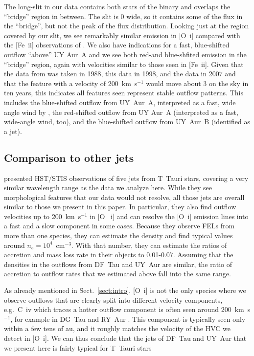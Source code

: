 \documentclass[twocolumn,trackchanges]{aastex63}
\begin{document}
The long-slit in our data contains both stars of the binary and overlaps the ``bridge'' region in between. The slit is 0 wide, so it contains some of the flux in the ``bridge'', but not the peak of the flux distribution. Looking just at the region covered by our slit, we see remarkably similar emission in [O~{\sc i}] compared with the [Fe~{\sc ii}] observations of \citet{2014ApJ...786...63P}. We also have indications for a fast, blue-shifted outflow ``above'' UY Aur~A and we see both red-and blue-shfited emission in the ``bridge'' region, again with velocities similar to those seen in [Fe~{\sc ii}]. Given that the data from \citet{1997A&AS..126..437H} was taken in 1988, this data in 1998, and the \citet{2014ApJ...786...63P} data in 2007 and that the feature with a velocity of 200~km~s$^{-1}$ would move about 3\arcsec{} on the sky in ten years, this indicates all features seen represent stable outflow patterns. This includes the blue-shifted outflow from UY~Aur~A, interpreted as a fast, wide angle wind by \citet{2014ApJ...786...63P}, the red-shifted outflow from UY Aur~A (interpreted as a fast, wide-angle wind, too), and the blue-shifted outflow from UY~Aur~B (identified as a jet).

\subsection{Comparison to other jets}
\citet{2008ApJ...689.1112C} presented HST/STIS observations of five jets from
T~Tauri stars, covering a very similar wavelength range as the data we analyze
here. While they see morphological features that our data would not resolve,
all those jets are overall similar to those we present in this paper. In
particular, they also find outflow velocities up to 200~km~s$^{-1}$ in [O~{\sc
    i}] and can resolve the [O~{\sc i}] emission lines into a fast and a slow
component in some cases. Because they observe FELs from more than one species,
they can estimate the density and find typical values around
$n_e=10^4$~cm$^{-3}$. With that number, they can estimate the ratios of
accretion and mass loss rate in their objects to 0.01-0.07. Assuming that the
densities in the outflows from DF~Tau and UY~Aur are similar, the ratio of
accretion to outflow rates that we estimated above fall into the same range. 

As already mentioned in Sect.~\ref{sect:intro}, [O~{\sc i}] is not the only
species where we observe outflows that are clearly split into different
velocity components, e.g.\ C~{\sc iv} which traces a hotter outflow component
is often seen around 200~km~s$^{-1}$, for example in DG~Tau
\citep{2013A&A...550L...1S} and RY~Aur \citep{2018ApJ...855..143S}. This
component is typically seen only within a few tens of au, and it roughly matches the
velocity of the HVC we detect in [O~{\sc i}]. We can thus conclude that the
jets of DF~Tau and UY~Aur that we present here is fairly typical for T~Tauri stars
\end{document}
